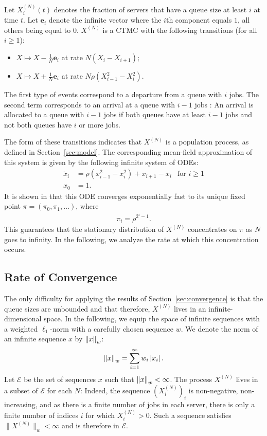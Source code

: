 \documentclass[acmlarge]{acmart}
\newcommand\XN{X^{(N)}}
\newcommand\E{\mathcal{E}}
\newcommand\norm[1]{{\mathchoice{\bnorm{#1}}{\snorm{#1}}{\snorm{#1}}{\snorm{#1}}}}
\newcommand\bnorm[1]{\left\|#1\right\|}
\newcommand\snorm[1]{\|#1\|}
\newcommand\abs[1]{\left|#1\right|}
\begin{document}
Let $\XN_i(t)$ denotes the fraction of servers that have a queue size
at least $i$ at time $t$. Let $\mathbf{e}_i$ denote the infinite
vector where the $i$th component equals $1$, all others being equal to
$0$.  $\XN$ is a CTMC with the following transitions (for all
$i\ge1$):
\begin{itemize}
\item $X \mapsto X-\frac{1}{N}\mathbf{e}_i$ at rate $N(X_{i}-X_{i+1})$;
\item $X \mapsto X+\frac1N\mathbf{e}_i$ at rate
  $N\rho(X^2_{i-1}-X^2_{i})$.
\end{itemize}
The first type of events correspond to a departure from a queue with
$i$ jobs. The second term corresponds to an arrival at a queue with
$i-1$ jobs : An arrival is allocated to a queue with $i-1$ jobs if
both queues have at least $i-1$ jobs and not both queues have $i$ or
more jobs.

The form of these transitions indicates that $\XN$ is a population
process, as defined in Section~\ref{sec:model}. The corresponding
mean-field approximation of this system is given by the following
infinite system of ODEs:
\begin{align*}
  \dot{x}_i &= \rho(x^2_{i-1}-x_i^2) + x_{i+1}-x_{i}
  &\text{for $i\ge1$}\\
  x_0 &= 1.
\end{align*}
It is shown in \cite{mitzenmacher1996power} that this ODE converges
exponentially fast to its unique fixed point
$\pi=(\pi_0,\pi_1,\dots)$, where
\begin{align*}
  \pi_{i} = \rho^{2^i-1}.  
\end{align*}
This guarantees that the stationary distribution of $\XN$ concentrates
on $\pi$ as $N$ goes to infinity.  In the following, we analyze the
rate at which this concentration occurs. 


\subsection{Rate of Convergence} 

The only difficulty for applying the results of
Section~\ref{sec:convergence} is that the queue sizes are unbounded
and that therefore, $\XN$ lives in an infinite-dimensional space. In
the following, we equip the space of infinite sequences with a
weighted $\ell_1$-norm with a carefully chosen sequence $w$. We denote
the norm of an infinite sequence $x$ by $\norm{x}_w$:
\begin{align*}
  \norm{x}_w=\sum_{i=1}^\infty w_i\abs{x_i}.
\end{align*}
Let $\E$ be the set of sequences $x$ such that $\norm{x}_w<\infty$.
The process $\XN$ lives in a subset of $\E$ for each $N$: Indeed, the
sequence $(\XN_i)_i$ is non-negative, non-increasing, and as there is
a finite number of jobs in each server, there is only a finite number
of indices $i$ for which $\XN_i>0$. Such a sequence satisfies
$\snorm{\XN}_w<\infty$ and is therefore in $\E$.
\end{document}
